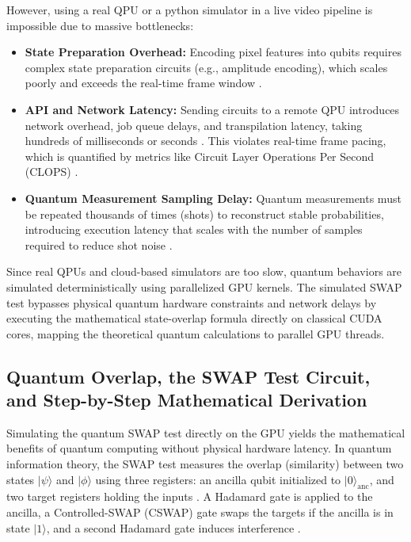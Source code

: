 However, using a real QPU or a python simulator in a live video pipeline is impossible due to massive bottlenecks:
\begin{itemize}
    \item \textbf{State Preparation Overhead:} Encoding pixel features into qubits requires complex state preparation circuits (e.g., amplitude encoding), which scales poorly and exceeds the real-time frame window \cite{bharti2022noisy, kerenidis2019q}.
    \item \textbf{API and Network Latency:} Sending circuits to a remote QPU introduces network overhead, job queue delays, and transpilation latency, taking hundreds of milliseconds or seconds \cite{fraunhofer2025quantum}. This violates real-time frame pacing, which is quantified by metrics like Circuit Layer Operations Per Second (CLOPS) \cite{wack2021qualityspeedscalekey}.
    \item \textbf{Quantum Measurement Sampling Delay:} Quantum measurements must be repeated thousands of times (shots) to reconstruct stable probabilities, introducing execution latency that scales with the number of samples required to reduce shot noise \cite{bharti2022noisy}.
\end{itemize}
Since real QPUs and cloud-based simulators are too slow, quantum behaviors are simulated deterministically using parallelized GPU kernels. The simulated SWAP test bypasses physical quantum hardware constraints and network delays by executing the mathematical state-overlap formula directly on classical CUDA cores, mapping the theoretical quantum calculations to parallel GPU threads.

\subsection{Quantum Overlap, the SWAP Test Circuit, and Step-by-Step Mathematical Derivation}
Simulating the quantum SWAP test directly on the GPU yields the mathematical benefits of quantum computing without physical hardware latency. In quantum information theory, the SWAP test measures the overlap (similarity) between two states $\lvert\psi\rangle$ and $\lvert\phi\rangle$ using three registers: an ancilla qubit initialized to $\lvert 0 \rangle_{\text{anc}}$, and two target registers holding the inputs \cite{buhrman2001quantum}. A Hadamard gate is applied to the ancilla, a Controlled-SWAP (CSWAP) gate swaps the targets if the ancilla is in state $\lvert1\rangle$, and a second Hadamard gate induces interference \cite{buhrman2001quantum}.


